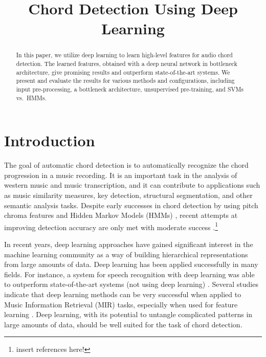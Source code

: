 \documentclass{article}
\title{Chord Detection Using Deep Learning}
\begin{document}
%
\maketitle
%
\begin{abstract}
In this paper, we utilize deep learning to learn high-level features for audio chord detection. The learned features, obtained with a deep neural network in bottleneck architecture, give promising results and outperform state-of-the-art systems. We present and evaluate the results for various methods and configurations, including input pre-processing, a bottleneck architecture, unsupervised pre-training, and SVMs vs.\ HMMs. 
\end{abstract}
%
\section{Introduction}
The goal of automatic chord detection is to automatically recognize the chord progression in a music recording. It is an important task in the analysis of western music and music transcription, and it can contribute to applications such as music similarity measures, key detection, structural segmentation, and other semantic analysis tasks. Despite early successes in chord detection by using pitch chroma features and Hidden Markov Models (HMMs) \cite{fujishima1999realtime}, recent attempts at improving detection accuracy are only met with moderate success \cite{}.\footnote{insert references here!} 

In recent years, deep learning approaches have gained significant interest in the machine learning community as a way of building hierarchical representations from large amounts of data. Deep learning has been applied successfully in many fields. For instance, a system for speech recognition with deep learning was able to outperform state-of-the-art systems (not using deep learning) \cite{hinton2012deep}. Several studies indicate that deep learning methods can be very successful when applied to Music Information Retrieval (MIR) tasks, especially when used for feature learning \cite{lee2009unsupervised,battenberg2012analyzing,humphrey2012moving,hamel2010learning}. Deep learning, with its potential to untangle complicated patterns in large amounts of data, should be well suited for the task of chord detection.
\end{document}

